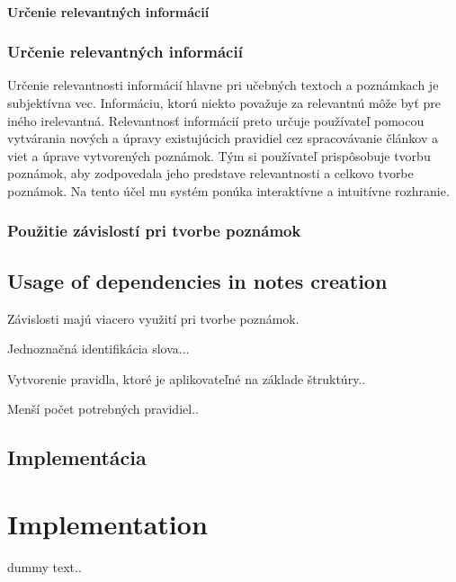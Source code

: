 %
%
{
	\subsubsection{Určenie relevantných informácií}
}
{
	\subsection{Určenie relevantných informácií}
}
\label{subsubsection:determination_of_relevant_information}
Určenie relevantnosti informácií hlavne pri učebných textoch a poznámkach je subjektívna vec. Informáciu, ktorú niekto považuje za relevantnú môže byť pre iného irelevantná. Relevantnosť informácií preto určuje používateľ pomocou vytvárania nových a úpravy existujúcich pravidiel cez spracovávanie článkov a viet a úprave vytvorených poznámok. Tým si používateľ prispôsobuje tvorbu poznámok, aby zodpovedala jeho predstave relevantnosti a celkovo tvorbe poznámok. Na tento účel mu systém ponúka interaktívne a intuitívne rozhranie.

%
%
{
	\subsection{Použitie závislostí pri tvorbe poznámok}
}
{
	\section{Usage of dependencies in notes creation}
}
\label{subsection:use_of_dependencies_in_notes_creation}
Závislosti majú viacero využití pri tvorbe poznámok.

Jednoznačná identifikácia slova...

Vytvorenie pravidla, ktoré je aplikovateľné na základe štruktúry..

Menší počet potrebných pravidiel..

\newpage
%
%
{
	\section{Implementácia}
}
{
	\chapter{Implementation}
}
\label{section:implementation}
dummy text..

